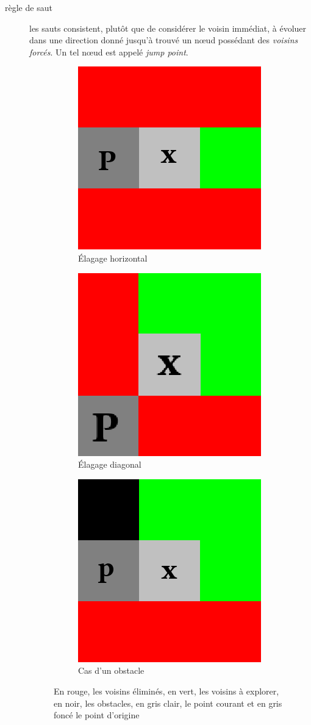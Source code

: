 \documentclass[a4paper,11pt]{article}
\begin{document}
\begin{description}
\item[règle de saut] les sauts consistent, plutôt que de considérer le voisin
    immédiat, à évoluer dans une direction donné jusqu'à trouvé un nœud
    possédant des \emph{voisins forcés}. Un tel nœud est appelé \emph{jump
    point}.
\begin{figure}[h]
\centering
\begin{subfigure}{.3\textwidth}
\centering
\includegraphics[width=0.5\linewidth]{droit.png}
\caption{Élagage horizontal}
\end{subfigure}
\begin{subfigure}{.3\textwidth}
\centering
\includegraphics[width=0.5\linewidth]{diag.png}
\caption{Élagage diagonal}
\end{subfigure}
\begin{subfigure}{.3\textwidth}
\centering
\includegraphics[width=0.5\linewidth]{obstacle.png}
\caption{Cas d'un obstacle}
\end{subfigure}
\caption{En rouge, les voisins éliminés, en vert, les voisins à explorer, en 
noir, les obstacles, en gris clair, le point courant et en gris foncé le point d'origine}
\end{figure}


\end{description}
\end{document}
